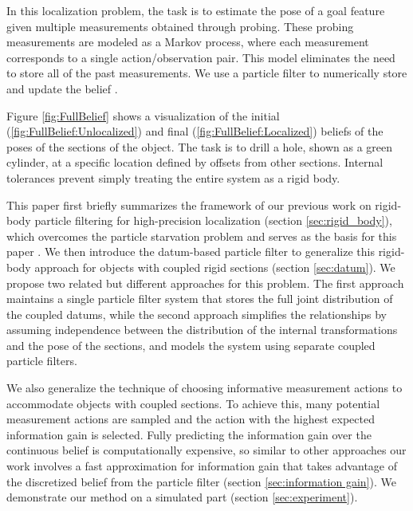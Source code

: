 \documentclass[letterpaper, 10 pt, conference]{ieeeconf}
\begin{document}
In this localization problem, the task is to estimate the pose of a goal feature given multiple measurements obtained through probing. 
These probing measurements are modeled as a Markov process, where each measurement corresponds to a single action/observation pair. 
This model eliminates the need to store all of the past measurements. 
We use a particle filter to numerically store and update the belief \cite{Thrun2000a}.

Figure \ref{fig:FullBelief} shows a visualization of the initial (\ref{fig:FullBelief:Unlocalized}) and final (\ref{fig:FullBelief:Localized}) beliefs of the poses of the sections of the object.
The task is to drill a hole, shown as a green cylinder, at a specific location defined by offsets from other sections.
Internal tolerances prevent simply treating the entire system as a rigid body.


This paper first briefly summarizes the framework of our previous work on rigid-body particle filtering for high-precision localization (section \ref{sec:rigid_body}), which overcomes the particle starvation problem and serves as the basis for this paper \cite{Saund2017}. 
We then introduce the datum-based particle filter to generalize this rigid-body approach for objects with coupled rigid sections (section \ref{sec:datum}).
We propose two related but different approaches for this problem. The first approach maintains a single particle filter system that stores the full joint distribution of the coupled datums, while the second approach simplifies the relationships by assuming independence between the distribution of the internal transformations and the pose of the sections, and models the system using separate coupled particle filters. 

We also generalize the technique of choosing informative measurement actions to accommodate objects with coupled sections. To achieve this, many potential measurement actions are sampled and the action with the highest expected information gain is selected. 
Fully predicting the information gain over the continuous belief is computationally expensive, so similar to other approaches \cite{Javdani2013} our work involves a fast approximation for information gain that takes advantage of the discretized belief from the particle filter (section \ref{sec:information gain}). 
We demonstrate our method on a simulated part (section \ref{sec:experiment}). 
\end{document}
